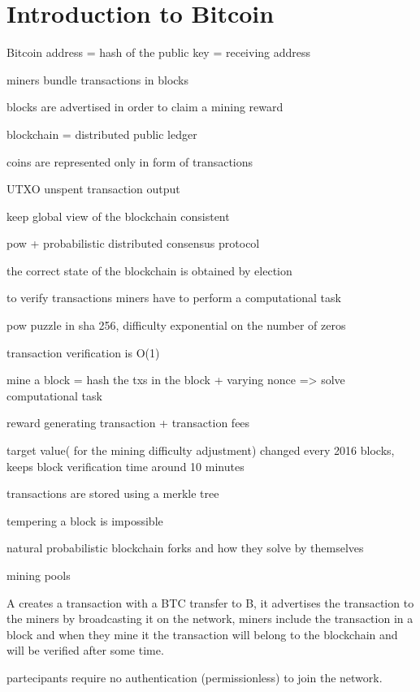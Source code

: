 \documentclass[12pt, letterpaper, twoside]{article}
\title{}
\author{}
\begin{document}
\maketitle

\section{Introduction to Bitcoin}\label{sec:introbtc}
Bitcoin address = hash of the public key = receiving address

miners bundle transactions in blocks

blocks are advertised in order to claim a mining reward

blockchain = distributed public ledger

coins are represented only in form of transactions

UTXO unspent transaction output

keep global view of the blockchain consistent

pow + probabilistic distributed consensus protocol

the correct state of the blockchain is obtained by election

to verify transactions miners have to perform a computational task

pow puzzle in sha 256, difficulty exponential on the number of zeros

transaction verification is O(1)

mine a block = hash the txs in the block + varying nonce => solve computational task

reward generating transaction + transaction fees

target value( for the mining difficulty adjustment) changed every 2016 blocks, keeps block verification time around 10 minutes

transactions are stored using a merkle tree

tempering a block is impossible 

natural probabilistic blockchain forks and how they solve by themselves

mining pools

A creates a transaction with a BTC transfer to B, it advertises the transaction to the miners by broadcasting it on the network, miners include the transaction in a block and when they mine it the transaction will belong to the blockchain and will be verified after some time.

partecipants require no authentication (permissionless) to join the network.
\end{document}

